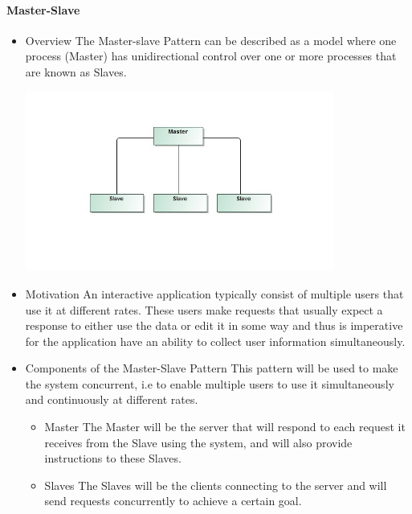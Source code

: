 \documentclass{article}
\begin{document}
	\paragraph{Master-Slave}
		\begin{itemize}
\item{Overview}
\newline
The Master-slave Pattern can be described as  a model where one process (Master) has unidirectional control over one or more processes that are known as Slaves. 
\newline
\begin{minipage}{\linewidth} 
\centering
\includegraphics[width=4in]{../Diagrams/ArchitecturalPatterns/MasterSlave.jpg}
\end{minipage}
\item{Motivation}
\newline
An interactive application typically consist of multiple users that use it at different rates. These users make requests that usually expect a response to either use the data or edit it in some way and thus is imperative for the application have an ability to collect user information simultaneously.

\item{Components of the Master-Slave Pattern}
\newline
This pattern will be used to make the system concurrent, i.e to enable multiple users to use it simultaneously and continuously at different rates.
\begin{itemize}
\item{Master} 
\newline
The Master will be the server that will respond to each request it receives from the Slave using the system, and will also provide instructions to these Slaves.
\item{Slaves}
\newline 
The Slaves will be the clients connecting to the server and will  send requests concurrently to achieve a certain goal.
\end{itemize}
\end{itemize}
\end{document}
